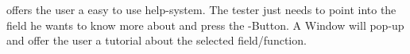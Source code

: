 \bxname{\GD} offers the user a easy to use help-system. The tester
just needs to point into  the field he wants to know more
about and press the -Button. A Window will pop-up and
offer the user  a tutorial about the selected field/function. 

